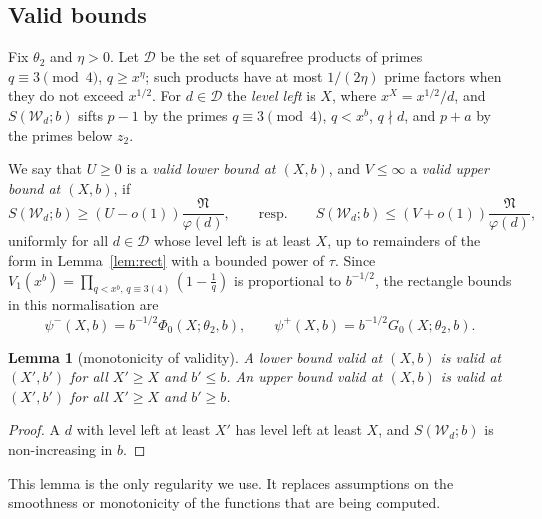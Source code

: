 \documentclass[11pt,a4paper]{amsart}
\newtheorem{lemma}[theorem]{Lemma}
\theoremstyle{remark}
\numberwithin{equation}{section}
\newcommand{\cW}{\mathcal W}
\newcommand{\cN}{\mathfrak N}
\begin{document}
\subsection{Valid bounds}
Fix $\theta_2$ and $\eta>0$. Let $\mathcal D$ be the set of squarefree products of primes $q\equiv3\pmod 4$,
$q\ge x^\eta$; such products have at most $1/(2\eta)$ prime factors when they do not exceed $x^{1/2}$. For
$d\in\mathcal D$ the \emph{level left} is $X$, where $x^X=x^{1/2}/d$, and $S(\cW_d;b)$ sifts $p-1$ by the primes
$q\equiv3\pmod 4$, $q<x^b$, $q\nmid d$, and $p+a$ by the primes below $z_2$.

We say that $U\ge0$ is a \emph{valid lower bound at $(X,b)$}, and $V\le\infty$ a \emph{valid upper bound at
$(X,b)$}, if
\[
S(\cW_d;b)\ge(U-o(1))\frac{\cN}{\varphi(d)},\qquad\text{resp.}\qquad S(\cW_d;b)\le(V+o(1))\frac{\cN}{\varphi(d)},
\]
uniformly for all $d\in\mathcal D$ whose level left is at least $X$, up to remainders of the form in
Lemma~\ref{lem:rect} with a bounded power of $\tau$. Since $V_1(x^b)=\prod_{q<x^b,\,q\equiv3(4)}(1-\frac1q)$ is
proportional to $b^{-1/2}$, the rectangle bounds in this normalisation are
\begin{equation}\label{eq:psi}
\psi^-(X,b)=b^{-1/2}\Phi_0(X;\theta_2,b),\qquad\psi^+(X,b)=b^{-1/2}G_0(X;\theta_2,b).
\end{equation}

\begin{lemma}[monotonicity of validity]\label{lem:mono}
A lower bound valid at $(X,b)$ is valid at $(X',b')$ for all $X'\ge X$ and $b'\le b$. An upper bound valid at
$(X,b)$ is valid at $(X',b')$ for all $X'\ge X$ and $b'\ge b$.
\end{lemma}
\begin{proof}
A $d$ with level left at least $X'$ has level left at least $X$, and $S(\cW_d;b)$ is non-increasing in $b$.
\end{proof}
This lemma is the only regularity we use. It replaces assumptions on the smoothness or monotonicity of the
functions that are being computed.
\end{document}
